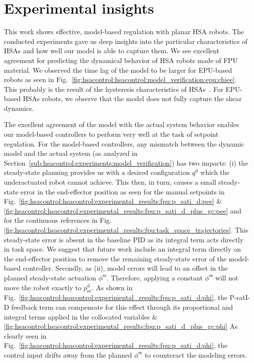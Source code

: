 \section{Experimental insights}
This work shows effective, model-based regulation with planar \gls{HSA} robots. The conducted experiments gave us deep insights into the particular characteristics of \glspl{HSA} and how well our model is able to capture them. We see excellent agreement for predicting the dynamical behavior of \gls{HSA} robots made of FPU material.
We observed the time lag of the model to be larger for EPU-based robots as seen in Fig.~\ref{fig:hsacontrol:hsacontrol:model_verification:epu:chiee}. This probably is the result of the hysteresis characteristics of \glspl{HSA}~\cite{good2022expanding}.
For EPU-based \glspl{HSA} robots, we observe that the model does not fully capture the shear dynamics.

The excellent agreement of the model with the actual system behavior enables our model-based controllers to perform very well at the task of setpoint regulation.
For the model-based controllers, any mismatch between the dynamic model and the actual system (as analyzed in Section~\ref{sub:hsacontrol:experiments:model_verification}) has two impacts: (i) the steady-state planning provides us with a desired configuration $q^\mathrm{d}$ which the underactuated robot cannot achieve. This then, in turn, causes a small steady-state error in the end-effector position as seen for the manual setpoints in Fig.~\ref{fig:hsacontrol:hsacontrol:experimental_results:fpu:p_sati_d:pee} \& \ref{fig:hsacontrol:hsacontrol:experimental_results:fpu:p_sati_d_plus_gc:pee} 
and for the continuous references in Fig.\ref{fig:hsacontrol:hsacontrol:experimental_results:fpu:task_space_trajectories}. This steady-state error is absent in the baseline PID as its integral term acts directly in task space. We suggest that future work include an integral term directly on the end-effector position to remove the remaining steady-state error of the model-based controller. Secondly, as (ii), model errors will lead to an offset in the planned steady-state actuation $\phi^\mathrm{ss}$. Therefore, applying a constant $\phi^\mathrm{ss}$ will not move the robot exactly to $p_\mathrm{ee}^\mathrm{d}$. As shown in Fig.~\ref{fig:hsacontrol:hsacontrol:experimental_results:fpu:p_sati_d:phi}, the P-satI-D feedback term can compensate for this effect through its proportional and integral terms applied in the collocated variables \& \ref{fig:hsacontrol:hsacontrol:experimental_results:fpu:p_sati_d_plus_gc:phi} 
As clearly seen in Fig.~\ref{fig:hsacontrol:hsacontrol:experimental_results:fpu:p_sati_d:phi}, the control input drifts away from the planned $\phi^\mathrm{ss}$ to counteract the modeling errors.


